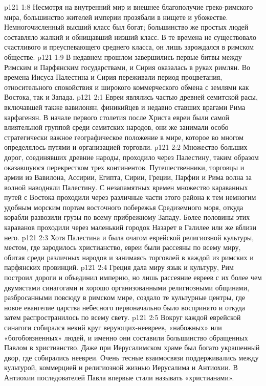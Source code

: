 \vs p121 1:8 Несмотря на внутренний мир и внешнее благополучие греко\hyp{}римского мира, большинство жителей империи прозябали в нищете и убожестве. Немногочисленный высший класс был богат; большинство же простых людей составляло жалкий и обнищавший низший класс. В те времена не существовало счастливого и преуспевающего среднего класса, он лишь зарождался в римском обществе.
\vs p121 1:9 В недавнем прошлом завершились первые битвы между Римским и Парфянским государствами, и Сирия оказалась в руках римлян. Во времена Иисуса Палестина и Сирия переживали период процветания, относительного спокойствия и широкого коммерческого обмена с землями как Востока, так и Запада.
\vs p121 2:1 Евреи являлись частью древней семитской расы, включавшей также вавилонян, финикийцев и недавно ставших врагами Рима карфагенян. В начале первого столетия после Христа евреи были самой влиятельной группой среди семитских народов, они же занимали особо стратегически важное географическое положение в мире, которое во многом определялось путями и организацией торговли.
\vs p121 2:2 Множество больших дорог, соединявших древние народы, проходило через Палестину, таким образом оказавшуюся перекрестком трех континентов. Путешественники, торговцы и армии из Вавилона, Ассирии, Египта, Сирии, Греции, Парфии и Рима волна за волной наводняли Палестину. С незапамятных времен множество караванных путей с Востока проходили через различные части этого района к тем немногим удобным морским портам восточного побережья Средиземного моря, откуда корабли развозили грузы по всему прибрежному Западу. Более половины этих караванов проходили через маленький городок Назарет в Галилее или же вблизи него.
\vs p121 2:3 Хотя Палестина и была очагом еврейской религиозной культуры, местом, где зародилось христианство, евреи были рассеяны по всему миру, обитая среди различных народов и занимаясь торговлей в каждой из римских и парфянских провинций.
\vs p121 2:4 Греция дала миру язык и культуру, Рим построил дороги и объединил империю, но лишь рассеяние евреев с их более чем двумястами синагогами и хорошо организованными религиозными общинами, разбросанными повсюду в римском мире, создало те культурные центры, где новое евангелие царства небесного первоначально было воспринято и откуда затем распространилось по всему свету.
\vs p121 2:5 Вокруг каждой еврейской синагоги собирался некий круг верующих\hyp{}неевреев, «набожных» или «богобоязненных» людей, и именно они составили большинство обращенных Павлом в христианство. Даже при Иерусалимском храме был богато украшенный двор, где собирались неевреи. Очень тесные взаимосвязи поддерживались между культурой, коммерцией и религиозной жизнью Иерусалима и Антиохии. В Антиохии последователей Павла впервые стали называть «христианами».
